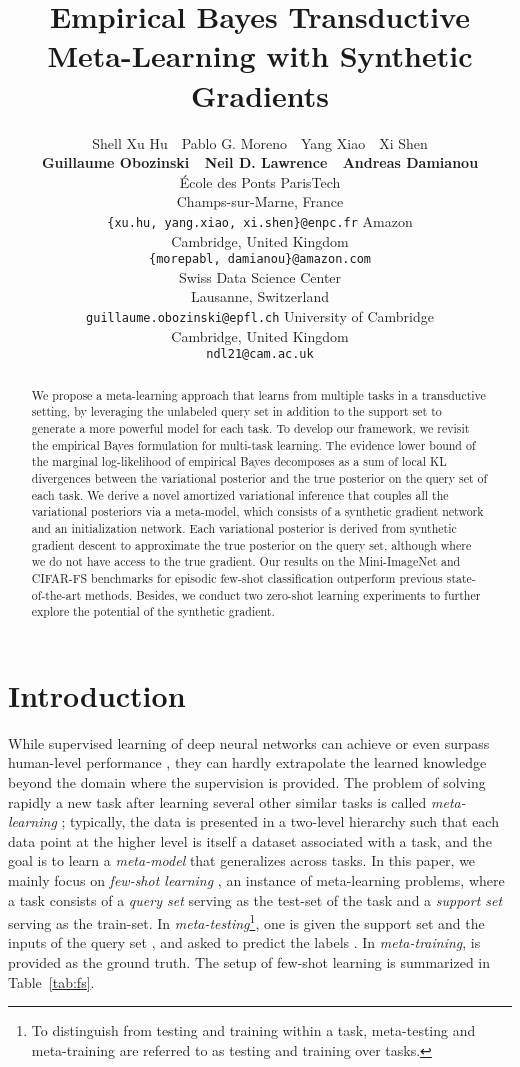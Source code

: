 \documentclass{article} \usepackage{iclr2020_conference,times}
\title{Empirical Bayes Transductive Meta-Learning with Synthetic Gradients}
\author{
  Shell Xu Hu \,\, Pablo G. Moreno \,\, Yang Xiao \,\, Xi Shen \\
  \hspace{0.03mm} \textbf{Guillaume Obozinski \,\, Neil D. Lawrence \,\, Andreas Damianou}\\
    \And
  École des Ponts ParisTech \\
  Champs-sur-Marne, France \\
  \texttt{\{xu.hu, yang.xiao, xi.shen\}@enpc.fr} 
    \And
  Amazon \\
  Cambridge, United Kingdom \\
  \texttt{\{morepabl, damianou\}@amazon.com}\\
    \And
  Swiss Data Science Center \\
  Lausanne, Switzerland \\
  \texttt{guillaume.obozinski@epfl.ch}
    \And
  University of Cambridge \\
  Cambridge, United Kingdom \\
  \texttt{ndl21@cam.ac.uk}
}
\begin{document}
\maketitle


\begin{abstract}
We propose a meta-learning approach that learns from multiple tasks in a transductive setting, by leveraging the unlabeled query set in addition to the support set to generate a more powerful model for each task. To develop our framework, we revisit the empirical Bayes formulation for multi-task learning. The evidence lower bound of the marginal log-likelihood of empirical Bayes decomposes as a sum of local KL divergences between the variational posterior and the true posterior on the query set of each task.
    We derive a novel amortized variational inference that couples all the variational posteriors via a meta-model, which consists of a synthetic gradient network and an initialization network. Each variational posterior is derived from synthetic gradient descent to approximate the true posterior on the query set, although where we do not have access to the true gradient.  
Our results on the Mini-ImageNet and CIFAR-FS benchmarks for episodic few-shot classification outperform previous state-of-the-art methods.
    Besides, we conduct two zero-shot learning experiments to further explore the potential of the synthetic gradient.
\end{abstract}


\section{Introduction}




While supervised learning of deep neural networks can achieve or even surpass human-level performance \citep{he2015delving,devlin2018bert},
they can hardly extrapolate the learned knowledge beyond the domain where the supervision is provided.
The problem of solving rapidly a new task
after learning several other similar tasks is called \emph{meta-learning} \citep{schmidhuber1987,bengio1991learning,thrun1998learning}; typically, the data is presented in a two-level hierarchy such that each data point at the higher level is itself a dataset associated with a task,
and the goal is to learn a \emph{meta-model} that generalizes across tasks.
In this paper, we mainly focus on \emph{few-shot learning} \citep{vinyals2016matching}, an instance of meta-learning problems,
where a task  consists of 
a \emph{query set}  serving as the test-set of the task
and a \emph{support set}  serving as the train-set.
In \emph{meta-testing}\footnote{To distinguish from testing and training within a task, meta-testing and meta-training are referred to as testing and training over tasks.}, 
one is given the support set and the inputs of the query set , and asked to predict the labels .
In \emph{meta-training},  is provided as the ground truth.
The setup of few-shot learning is summarized in Table~\ref{tab:fs}.
\end{document}
